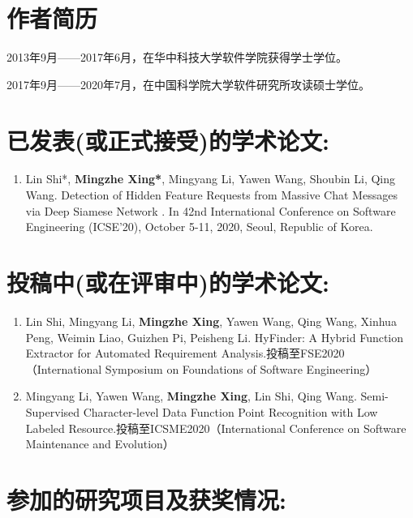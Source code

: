 
\section*{作者简历}

2013年9月——2017年6月，在华中科技大学软件学院获得学士学位。

2017年9月——2020年7月，在中国科学院大学软件研究所攻读硕士学位。

\section*{已发表(或正式接受)的学术论文:}

{
\setlist[enumerate]{}%
\begin{enumerate}[nosep]
    \item Lin Shi*, \textbf{Mingzhe Xing*}, Mingyang Li, Yawen Wang, Shoubin Li, Qing Wang. Detection of Hidden Feature Requests from Massive Chat Messages via Deep Siamese Network . In 42nd International Conference on Software Engineering (ICSE’20), October 5-11, 2020, Seoul, Republic of Korea.
\end{enumerate}
}

\section*{投稿中(或在评审中)的学术论文:}

{
\setlist[enumerate]{}%
\begin{enumerate}[nosep]
    \item Lin Shi, Mingyang Li, \textbf{Mingzhe Xing}, Yawen Wang, Qing Wang, Xinhua Peng, Weimin Liao, Guizhen Pi, Peisheng Li. HyFinder: A Hybrid Function Extractor for Automated Requirement Analysis.投稿至FSE2020（International Symposium on Foundations of Software Engineering）
    \item Mingyang Li, Yawen Wang, \textbf{Mingzhe Xing}, Lin Shi, Qing Wang. Semi-Supervised Character-level Data Function Point Recognition with Low Labeled Resource.投稿至ICSME2020（International Conference on Software Maintenance and Evolution）
\end{enumerate}
}


\section*{参加的研究项目及获奖情况:}

